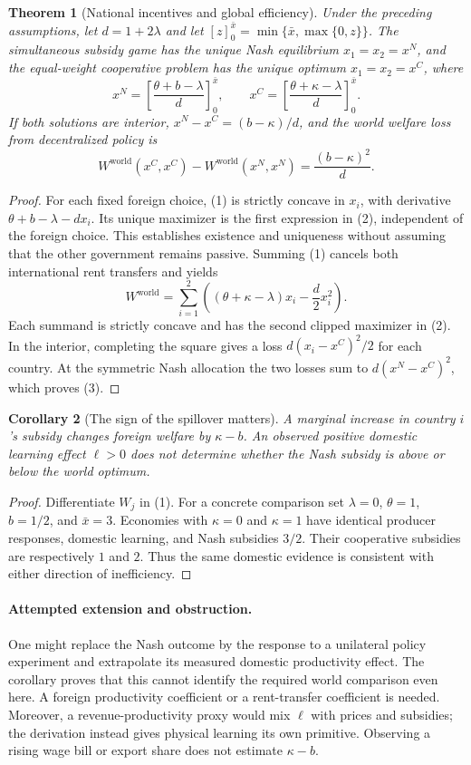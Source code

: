 \documentclass[11pt]{article}
\newtheorem{theorem}{Theorem}
\newtheorem{corollary}[theorem]{Corollary}
\theoremstyle{definition}
\begin{document}
\begin{theorem}[National incentives and global efficiency]
Under the preceding assumptions, let $d=1+2\lambda$ and let $[z]_0^{\bar x}=\min\{\bar x,\max\{0,z\}\}$. The simultaneous subsidy game has the unique Nash equilibrium $x_1=x_2=x^N$, and the equal-weight cooperative problem has the unique optimum $x_1=x_2=x^C$, where
\[
 x^N=\left[\frac{\theta+b-\lambda}{d}\right]_0^{\bar x},
 \qquad
 x^C=\left[\frac{\theta+\kappa-\lambda}{d}\right]_0^{\bar x}.
 \tag{2}
\]
If both solutions are interior, $x^N-x^C=(b-\kappa)/d$, and the world welfare loss from decentralized policy is
\[
 W^{\mathrm{world}}(x^C,x^C)
 -W^{\mathrm{world}}(x^N,x^N)
 =\frac{(b-\kappa)^2}{d}.
 \tag{3}
\]
\end{theorem}
\begin{proof}
For each fixed foreign choice, (1) is strictly concave in $x_i$, with derivative $\theta+b-\lambda-dx_i$. Its unique maximizer is the first expression in (2), independent of the foreign choice. This establishes existence and uniqueness without assuming that the other government remains passive. Summing (1) cancels both international rent transfers and yields
\[
 W^{\mathrm{world}}=\sum_{i=1}^2
 \left((\theta+\kappa-\lambda)x_i-\frac d2x_i^2\right).
\]
Each summand is strictly concave and has the second clipped maximizer in (2). In the interior, completing the square gives a loss $d(x_i-x^C)^2/2$ for each country. At the symmetric Nash allocation the two losses sum to $d(x^N-x^C)^2$, which proves (3).
\end{proof}

\begin{corollary}[The sign of the spillover matters]
A marginal increase in country $i$'s subsidy changes foreign welfare by $\kappa-b$. An observed positive domestic learning effect $\ell>0$ does not determine whether the Nash subsidy is above or below the world optimum.
\end{corollary}
\begin{proof}
Differentiate $W_j$ in (1). For a concrete comparison set $\lambda=0$, $\theta=1$, $b=1/2$, and $\bar x=3$. Economies with $\kappa=0$ and $\kappa=1$ have identical producer responses, domestic learning, and Nash subsidies $3/2$. Their cooperative subsidies are respectively $1$ and $2$. Thus the same domestic evidence is consistent with either direction of inefficiency.
\end{proof}

\paragraph{Attempted extension and obstruction.}
One might replace the Nash outcome by the response to a unilateral policy experiment and extrapolate its measured domestic productivity effect. The corollary proves that this cannot identify the required world comparison even here. A foreign productivity coefficient or a rent-transfer coefficient is needed. Moreover, a revenue-productivity proxy would mix $\ell$ with prices and subsidies; the derivation instead gives physical learning its own primitive. Observing a rising wage bill or export share does not estimate $\kappa-b$.
\end{document}
